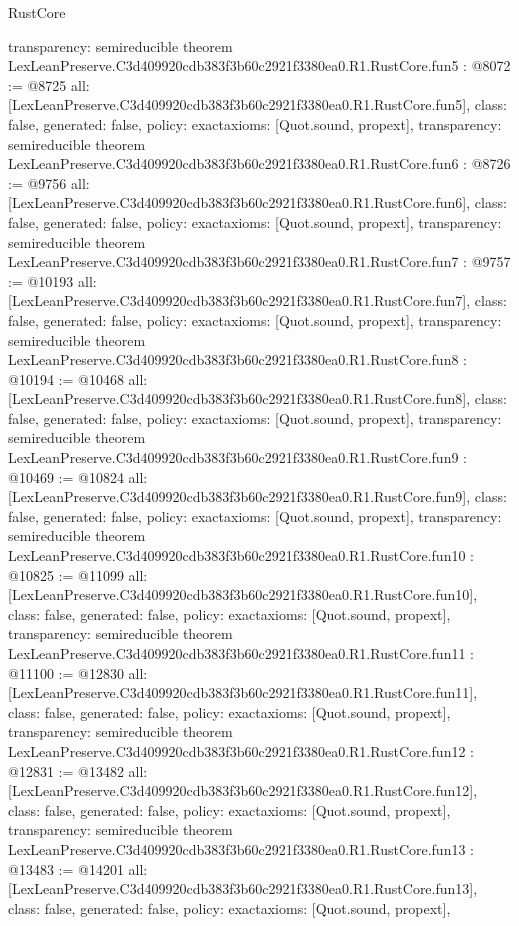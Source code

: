 \begin{lexlean}{RustCore}
\begin{coremodule}
{  transparency: semireducible
}
theorem LexLeanPreserve.C3d409920cdb383f3b60c2921f3380ea0.R1.RustCore.fun5 : @8072 := @8725 {
  all: [LexLeanPreserve.C3d409920cdb383f3b60c2921f3380ea0.R1.RustCore.fun5],
  class: false,
  generated: false,
  policy: exact{axioms: [Quot.sound, propext]},
  transparency: semireducible
}
theorem LexLeanPreserve.C3d409920cdb383f3b60c2921f3380ea0.R1.RustCore.fun6 : @8726 := @9756 {
  all: [LexLeanPreserve.C3d409920cdb383f3b60c2921f3380ea0.R1.RustCore.fun6],
  class: false,
  generated: false,
  policy: exact{axioms: [Quot.sound, propext]},
  transparency: semireducible
}
theorem LexLeanPreserve.C3d409920cdb383f3b60c2921f3380ea0.R1.RustCore.fun7 : @9757 := @10193 {
  all: [LexLeanPreserve.C3d409920cdb383f3b60c2921f3380ea0.R1.RustCore.fun7],
  class: false,
  generated: false,
  policy: exact{axioms: [Quot.sound, propext]},
  transparency: semireducible
}
theorem LexLeanPreserve.C3d409920cdb383f3b60c2921f3380ea0.R1.RustCore.fun8 : @10194 := @10468 {
  all: [LexLeanPreserve.C3d409920cdb383f3b60c2921f3380ea0.R1.RustCore.fun8],
  class: false,
  generated: false,
  policy: exact{axioms: [Quot.sound, propext]},
  transparency: semireducible
}
theorem LexLeanPreserve.C3d409920cdb383f3b60c2921f3380ea0.R1.RustCore.fun9 : @10469 := @10824 {
  all: [LexLeanPreserve.C3d409920cdb383f3b60c2921f3380ea0.R1.RustCore.fun9],
  class: false,
  generated: false,
  policy: exact{axioms: [Quot.sound, propext]},
  transparency: semireducible
}
theorem LexLeanPreserve.C3d409920cdb383f3b60c2921f3380ea0.R1.RustCore.fun10 : @10825 := @11099 {
  all: [LexLeanPreserve.C3d409920cdb383f3b60c2921f3380ea0.R1.RustCore.fun10],
  class: false,
  generated: false,
  policy: exact{axioms: [Quot.sound, propext]},
  transparency: semireducible
}
theorem LexLeanPreserve.C3d409920cdb383f3b60c2921f3380ea0.R1.RustCore.fun11 : @11100 := @12830 {
  all: [LexLeanPreserve.C3d409920cdb383f3b60c2921f3380ea0.R1.RustCore.fun11],
  class: false,
  generated: false,
  policy: exact{axioms: [Quot.sound, propext]},
  transparency: semireducible
}
theorem LexLeanPreserve.C3d409920cdb383f3b60c2921f3380ea0.R1.RustCore.fun12 : @12831 := @13482 {
  all: [LexLeanPreserve.C3d409920cdb383f3b60c2921f3380ea0.R1.RustCore.fun12],
  class: false,
  generated: false,
  policy: exact{axioms: [Quot.sound, propext]},
  transparency: semireducible
}
theorem LexLeanPreserve.C3d409920cdb383f3b60c2921f3380ea0.R1.RustCore.fun13 : @13483 := @14201 {
  all: [LexLeanPreserve.C3d409920cdb383f3b60c2921f3380ea0.R1.RustCore.fun13],
  class: false,
  generated: false,
  policy: exact{axioms: [Quot.sound, propext]},
}
\end{coremodule}
\end{lexlean}
